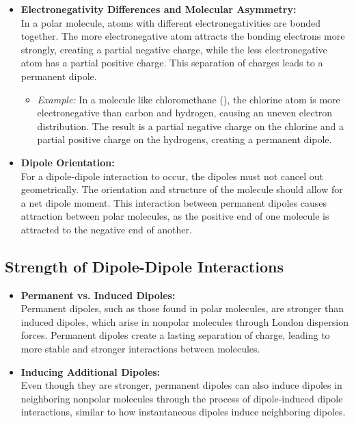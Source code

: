 \documentclass{report}
\begin{document}
\begin{itemize}
	\item \textbf{Electronegativity Differences and Molecular Asymmetry:} \\
	      In a polar molecule, atoms with different electronegativities are bonded together. The more electronegative atom attracts the bonding electrons more strongly, creating a partial negative charge, while the less electronegative atom has a partial positive charge. This separation of charges leads to a permanent dipole.

	      \begin{itemize}
		      \item \textit{Example:} In a molecule like chloromethane (), the chlorine atom is more electronegative than carbon and hydrogen, causing an uneven electron distribution. The result is a partial negative charge on the chlorine and a partial positive charge on the hydrogens, creating a permanent dipole.
	      \end{itemize}

	\item \textbf{Dipole Orientation:} \\
	      For a dipole-dipole interaction to occur, the dipoles must not cancel out geometrically. The orientation and structure of the molecule should allow for a net dipole moment. This interaction between permanent dipoles causes attraction between polar molecules, as the positive end of one molecule is attracted to the negative end of another.

\end{itemize}

\subsection{Strength of Dipole-Dipole Interactions}

\begin{itemize}
	\item \textbf{Permanent vs. Induced Dipoles:} \\
	      Permanent dipoles, such as those found in polar molecules, are stronger than induced dipoles, which arise in nonpolar molecules through London dispersion forces. Permanent dipoles create a lasting separation of charge, leading to more stable and stronger interactions between molecules.

	\item \textbf{Inducing Additional Dipoles:} \\
	      Even though they are stronger, permanent dipoles can also induce dipoles in neighboring nonpolar molecules through the process of dipole-induced dipole interactions, similar to how instantaneous dipoles induce neighboring dipoles.

\end{itemize}
\end{document}
